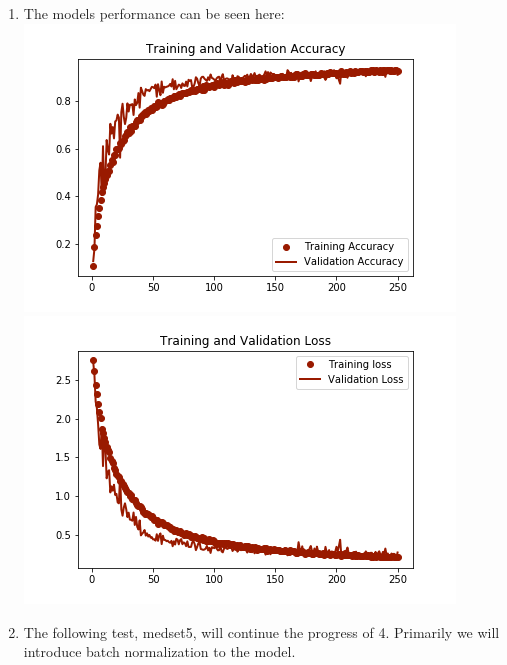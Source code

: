 \documentclass[12pt]{article} %
\begin{document}
\begin{enumerate}[label = (\roman*)]
\item The models performance can be seen here:
\newline\includegraphics{train-vs-val-acc-medset4}
\newline\includegraphics{train-vs-val-loss-medset4}
\item The following test, medset5, will continue the progress of 4. Primarily we will introduce batch normalization to the model.


\end{enumerate}
\end{document}
